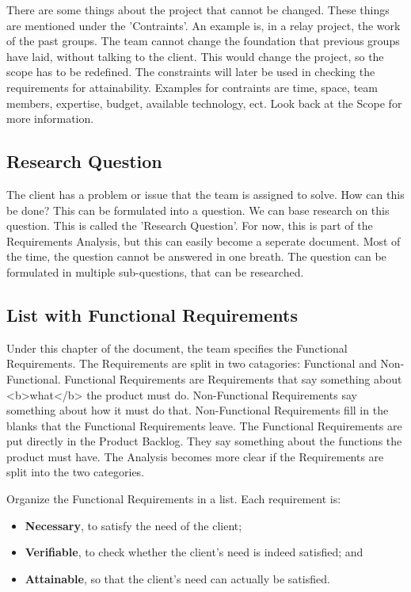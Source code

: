 \documentclass[10pt]{report}
\begin{document}
There are some things about the project that cannot be changed. These things are mentioned under the 'Contraints'. An example is, in a relay project, the work of the past groups. The team cannot change the foundation that previous groups have laid, without talking to the client. This would change the project, so the scope has to be redefined. The constraints will later be used in checking the requirements for attainability. Examples for contraints are time, space, team members, expertise, budget, available technology, ect. Look back at the Scope for more information.

\subsection{Research Question}

The client has a problem or issue that the team is assigned to solve. How can this be done? This can be formulated into a question. We can base research on this question. This is called the 'Research Question'. For now, this is part of the Requirements Analysis, but this can easily become a seperate document. Most of the time, the question cannot be answered in one breath. The question can be formulated in multiple sub-questions, that can be researched.

\subsection{List with Functional Requirements}

Under this chapter of the document, the team specifies the Functional Requirements. The Requirements are split in two catagories: Functional and Non-Functional. Functional Requirements are Requirements that say something about <b>what</b> the product must do. Non-Functional Requirements say something about how it must do that. Non-Functional Requirements fill in the blanks that the Functional Requirements leave. The Functional Requirements are put directly in the Product Backlog. They say something about the functions the product must have. The Analysis becomes more clear if the Requirements are split into the two categories.

Organize the Functional Requirements in a list. Each requirement is:

\begin{itemize}
	\item \textbf{Necessary}, to satisfy the need of the client;
	\item \textbf{Verifiable}, to check whether the client's need is indeed satisfied; and
	\item \textbf{Attainable}, so that the client's need can actually be satisfied. 
\end{itemize}
\end{document}

